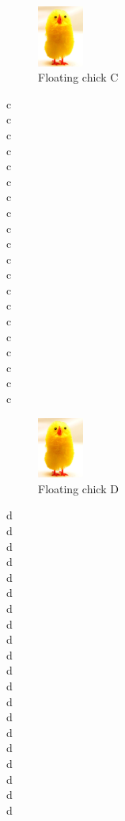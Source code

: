\documentclass[12pt]{article}
\begin{document}
    \begin{figure}
      \includegraphics[height=2cm]{image.png}
      \caption{Floating chick C}
    \end{figure}

    c \\ c \\ c \\ c\\ c \\ c \\ c \\ c \\ c\\ c \\
    c \\ c \\ c \\ c\\ c \\ c \\ c \\ c \\ c\\ c \\

    \begin{figure}
      \includegraphics[height=2cm]{image.png}
      \caption{Floating chick D}
    \end{figure}

    d \\ d \\ d \\ d\\ d \\ d \\ d \\ d \\ d\\ d \\
    d \\ d \\ d \\ d\\ d \\ d \\ d \\ d \\ d\\ d \\
\end{document}

